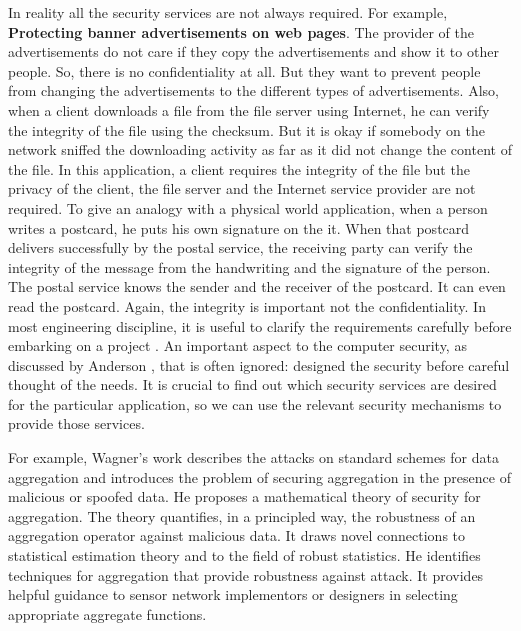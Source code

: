 	In reality all the security services are not always required.
	For example, \textbf{Protecting banner advertisements on web pages}. 
	The provider of the advertisements do not care if they copy the advertisements and show it to other people.
	So, there is no confidentiality at all.
	But they want to prevent people from changing the advertisements to the different types of advertisements.
	Also, when a client downloads a file from the file server using Internet, he can verify the integrity of the file using the checksum.
	But it is okay if somebody on the network sniffed the downloading activity as far as it did not change the content of the file.
	In this application, a client requires the integrity of the file but the privacy of the client, the file server and the Internet service provider are not required.
	To give an analogy with a physical world application, when a person writes a postcard, he puts his own signature on the it. 
	When that postcard delivers successfully by the postal service, the receiving party can verify the integrity of the message from the handwriting and the signature of the person.
	The postal service knows the sender and the receiver of the postcard.
	It can even read the postcard.
	Again, the integrity is important not the confidentiality.
	In most engineering discipline, it is useful to clarify the requirements carefully before embarking on a project \cite{2002-Stajano-ubiquitous}.
	An important aspect to the computer security, as discussed by Anderson \cite{anderson1993cryptosystems}, that is often ignored: designed the security before careful thought of the needs.
 	It is crucial to find out which security services are desired for the particular application, so we can use the relevant security mechanisms to provide those services.
	

	For example, Wagner's work \cite{wagner2004resilient} describes the attacks on standard schemes for data aggregation and introduces the problem of securing aggregation in the presence of malicious or spoofed data.
	He proposes a mathematical theory of security for aggregation.
	The theory quantifies, in a principled way, the robustness of an aggregation operator against malicious data.
	It draws novel connections to statistical estimation theory and to the field of robust statistics.
	He identifies techniques for aggregation that provide robustness against attack. 
	It provides helpful guidance to sensor network implementors or designers in selecting appropriate aggregate functions.

